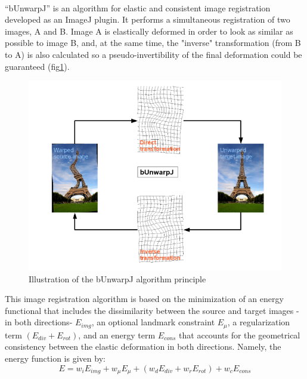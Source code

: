 \paragraph{}
"`bUnwarpJ"' is an algorithm for elastic and consistent image registration developed as an ImageJ plugin. It performs a simultaneous registration of two images, A and B. Image A is elastically deformed in order to look as similar as possible to image B, and, at the same time, the "inverse" transformation (from B to A) is also calculated so a pseudo-invertibility of the final deformation could be guaranteed (fig\ref{fig:scheme_bunwrapJ}).

\begin{figure}[H] %
	\centering%
  \includegraphics[width=\textwidth]{figures/Chapter_1/BUnwarpJ_scheme.png}
	\caption{Illustration of the bUnwarpJ algorithm principle}
	\label{fig:scheme_bunwrapJ}
\end{figure}

This image registration algorithm is based on the minimization of an energy functional that includes the dissimilarity between the source and target images -in both directions- $E_{img}$, an optional landmark constraint $E_{\mu}$, a regularization term $(E_{div} + E_{rot})$, and an energy term $E_{cons}$ that accounts for the geometrical consistency between the elastic deformation in both directions. Namely, the energy function is given by:
\begin{equation*}
		E = w_iE_{img} + w_{\mu}E_{\mu} + (w_dE_{div} + w_rE_{rot}) + w_cE_{cons} 
\end{equation*}
                  

